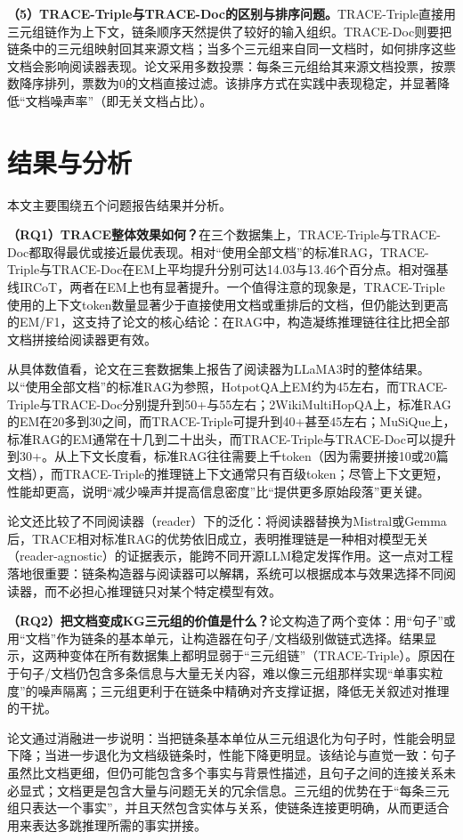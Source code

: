 \textbf{（5）TRACE-Triple与TRACE-Doc的区别与排序问题。}TRACE-Triple直接用三元组链作为上下文，链条顺序天然提供了较好的输入组织。TRACE-Doc则要把链条中的三元组映射回其来源文档；当多个三元组来自同一文档时，如何排序这些文档会影响阅读器表现。论文采用多数投票：每条三元组给其来源文档投票，按票数降序排列，票数为0的文档直接过滤。该排序方式在实践中表现稳定，并显著降低“文档噪声率”（即无关文档占比）。

\section{结果与分析}
本文主要围绕五个问题报告结果并分析。

\textbf{（RQ1）TRACE整体效果如何？}在三个数据集上，TRACE-Triple与TRACE-Doc都取得最优或接近最优表现。相对“使用全部文档”的标准RAG，TRACE-Triple与TRACE-Doc在EM上平均提升分别可达14.03与13.46个百分点。相对强基线IRCoT，两者在EM上也有显著提升。一个值得注意的现象是，TRACE-Triple使用的上下文token数量显著少于直接使用文档或重排后的文档，但仍能达到更高的EM/F1，这支持了论文的核心结论：在RAG中，构造凝练推理链往往比把全部文档拼接给阅读器更有效。

从具体数值看，论文在三套数据集上报告了阅读器为LLaMA3时的整体结果。以“使用全部文档”的标准RAG为参照，HotpotQA上EM约为45左右，而TRACE-Triple与TRACE-Doc分别提升到50+与55左右；2WikiMultiHopQA上，标准RAG的EM在20多到30之间，而TRACE-Triple可提升到40+甚至45左右；MuSiQue上，标准RAG的EM通常在十几到二十出头，而TRACE-Triple与TRACE-Doc可以提升到30+。从上下文长度看，标准RAG往往需要上千token（因为需要拼接10或20篇文档），而TRACE-Triple的推理链上下文通常只有百级token；尽管上下文更短，性能却更高，说明“减少噪声并提高信息密度”比“提供更多原始段落”更关键。

论文还比较了不同阅读器（reader）下的泛化：将阅读器替换为Mistral或Gemma后，TRACE相对标准RAG的优势依旧成立，表明推理链是一种相对模型无关（reader-agnostic）的证据表示，能跨不同开源LLM稳定发挥作用。这一点对工程落地很重要：链条构造器与阅读器可以解耦，系统可以根据成本与效果选择不同阅读器，而不必担心推理链只对某个特定模型有效。

\textbf{（RQ2）把文档变成KG三元组的价值是什么？}论文构造了两个变体：用“句子”或用“文档”作为链条的基本单元，让构造器在句子/文档级别做链式选择。结果显示，这两种变体在所有数据集上都明显弱于“三元组链”（TRACE-Triple）。原因在于句子/文档仍包含多条信息与大量无关内容，难以像三元组那样实现“单事实粒度”的噪声隔离；三元组更利于在链条中精确对齐支撑证据，降低无关叙述对推理的干扰。

论文通过消融进一步说明：当把链条基本单位从三元组退化为句子时，性能会明显下降；当进一步退化为文档级链条时，性能下降更明显。该结论与直觉一致：句子虽然比文档更细，但仍可能包含多个事实与背景性描述，且句子之间的连接关系未必显式；文档更是包含大量与问题无关的冗余信息。三元组的优势在于“每条三元组只表达一个事实”，并且天然包含实体与关系，使链条连接更明确，从而更适合用来表达多跳推理所需的事实拼接。

